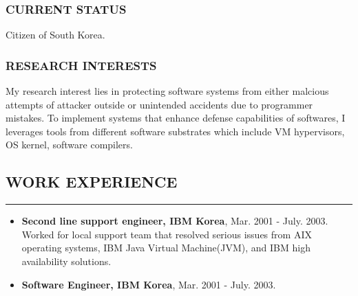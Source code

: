 \documentclass[10pt,a4]{article}
\begin{document}
\begin{small}
\subsubsection*{CURRENT STATUS}
\begin{list}{}{}
\item Citizen of South Korea.
\end{list}

\subsubsection*{RESEARCH INTERESTS}

\begin{list}{}{}
\item My research interest lies in protecting software systems from either
  malcious attempts of attacker outside or unintended accidents due to
  programmer mistakes. To implement systems that enhance defense capabilities of
  softwares, I leverages tools from different software substrates which include
  VM hypervisors, OS kernel, software compilers.
\end{list}

\subsection*{WORK EXPERIENCE}
\hrule
\vspace{0.2cm}
\begin{itemize}
\item {\bf Second line support engineer, IBM Korea},
  Mar. 2001 - July. 2003. \\
 Worked for local support team that resolved serious issues from AIX operating
 systems, IBM Java Virtual Machine(JVM), and IBM high availability solutions.
\item {\bf Software Engineer, IBM Korea}, Mar. 2001 - July. 2003. \\

\end{itemize}


\end{small}
\end{document}
